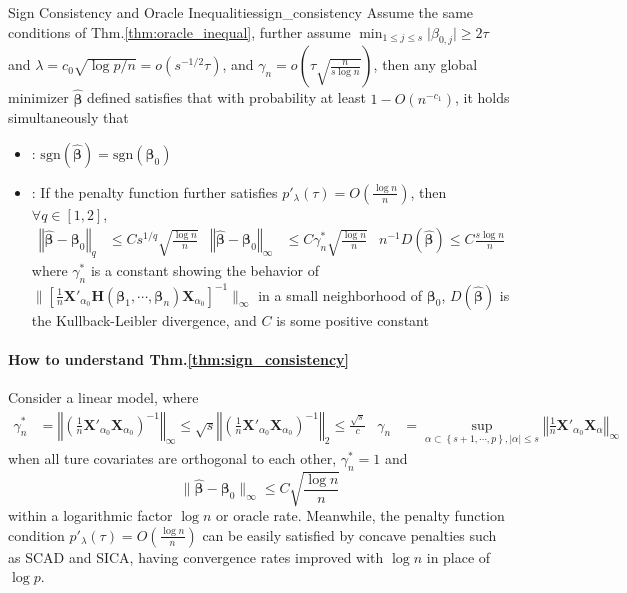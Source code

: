 \documentclass[twoside]{article}
\begin{document}
\begin{theorem}{Sign Consistency and Oracle Inequalities}{sign_consistency}
    Assume the same conditions of Thm.\ref{thm:oracle_inequal}, further assume $\min_{1\leq j \leq s}\lvert \beta_{0,j} \rvert \geq 2\tau $ and $\lambda = c_0\sqrt{\log p/n} = o(s^{-1/2}\tau)$, and $\gamma_n = o\left(\tau \sqrt{\frac{n}{s\log n}}\right)$, then any global minimizer $\hat{\boldsymbol{\beta}}$ defined satisfies that with probability at least $1-O(n^{-c_1})$, it holds simultaneously that 
    \begin{itemize}
        \item {}: $\mathrm{sgn}\left( \hat{\boldsymbol{\beta}} \right)=\mathrm{sgn}\left( \boldsymbol{\beta}_0 \right)$
        \item {}: If the penalty function further satisfies $p'_{\lambda}(\tau) = O\left(\frac{\log n}{n}\right)$, then $\forall q\in [1,2]$,
        \begin{align*}
            \left\Vert \hat{\boldsymbol{\beta}} -\boldsymbol{\beta}_0\right\Vert _q &\leq Cs^{1/q}\sqrt{\frac{\log n}{n}} & \left\Vert \hat{\boldsymbol{\beta}} -\boldsymbol{\beta}_0\right\Vert _{\infty} &\leq C\gamma_n^*\sqrt{\frac{\log n}{n}} & n^{-1}D\left( \hat{\boldsymbol{\beta}} \right) \leq C\frac{s\log n}{n} 
        \end{align*}
        where $\gamma^*_n$ is a constant showing the behavior of $\lVert \left[\frac{1}{n} \mathbf{X}'_{\alpha_0}\mathbf{H}\left(\boldsymbol{\beta}_1,\cdots,\boldsymbol{\beta}_n\right)\mathbf{X}_{\alpha_0} \right]^{-1} \rVert _{\infty}$ in a small neighborhood of $\boldsymbol{\beta}_0$, $D(\hat{\boldsymbol{\beta}})$ is the Kullback-Leibler divergence, and $C$ is some positive constant
    \end{itemize}
\end{theorem}

\paragraph*{How to understand Thm.\ref{thm:sign_consistency}} Consider a linear model, where
\begin{align*}
    \gamma_n^* &= \left\Vert \left( \frac{1}{n}\mathbf{X}'_{\alpha_0}\mathbf{X}_{\alpha_0} \right)^{-1} \right\Vert _{\infty} \leq \sqrt{s} \left\Vert \left( \frac{1}{n}\mathbf{X}'_{\alpha_0}\mathbf{X}_{\alpha_0} \right)^{-1} \right\Vert _2 \leq \frac{\sqrt{s}}{c} & \gamma_n & = \sup_{\alpha \subset \left\{ s+1,\cdots,p \right\},\lvert\alpha\rvert\leq s } \left\Vert \frac{1}{n}\mathbf{X}'_{\alpha_0}\mathbf{X}_{\alpha} \right\Vert _{\infty}
\end{align*} 
when all ture covariates are orthogonal to each other, $\gamma_n^*=1$ and  
$$
\lVert \hat{\boldsymbol{\beta}}-\boldsymbol{\beta}_0\rVert _{\infty}\leq C \sqrt{\frac{\log n}{n}}
$$
within a logarithmic factor $\log n$ or oracle rate. Meanwhile, the penalty function condition $p'_{\lambda}(\tau) = O\left(\frac{\log n}{n}\right)$ can be easily satisfied by concave penalties such as SCAD and SICA, having convergence rates improved with $\log n$ in place of $\log p$.
\end{document}
